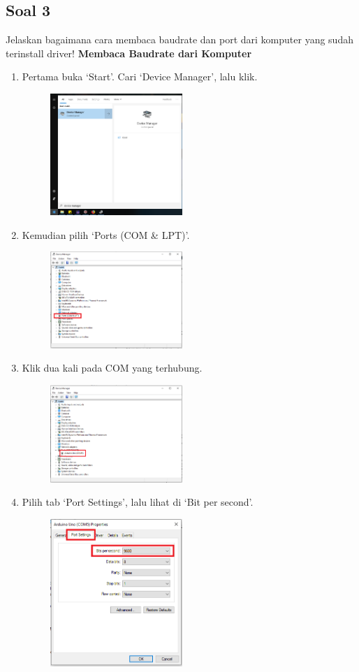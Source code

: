 \subsection{Soal 3}
Jelaskan bagaimana cara membaca baudrate dan port dari komputer yang sudah terinstall driver!
\textbf{Membaca Baudrate dari Komputer}
\begin{enumerate}
	\item Pertama buka `Start'. Cari `Device Manager', lalu klik.
	\begin{figure}[H]
		\includegraphics[width=5cm]{figures/5/1154016/Teori/d1.png}
		\centering
	\end{figure}
	\item Kemudian pilih `Ports (COM \& LPT)'.
	\begin{figure}[H]
		\includegraphics[width=5cm]{figures/5/1154016/Teori/d3.png}
		\centering
	\end{figure}
	\item Klik dua kali pada COM yang terhubung.
	\begin{figure}[H]
		\includegraphics[width=5cm]{figures/5/1154016/Teori/d2.png}
		\centering
	\end{figure}
	\item Pilih tab `Port Settings', lalu lihat di `Bit per second'.
	\begin{figure}[H]
		\includegraphics[width=5cm]{figures/5/1154016/Teori/d4.png}
		\centering
	\end{figure}
\end{enumerate}

